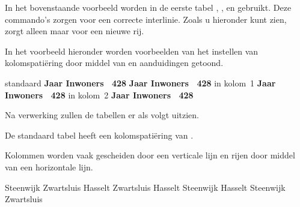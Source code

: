 In het bovenstaande voorbeeld worden in de eerste tabel
\type{\SR}, \type{\FR}, \type{\MR} en \type{\LR} gebruikt.
Deze commando's zorgen voor een correcte interlinie. Zoals u
hieronder kunt zien, zorgt \type{\NR} alleen maar voor een
nieuwe rij.

\haalbuffer

In het voorbeeld hieronder worden voorbeelden van het
instellen van kolomspati\"ering door middel van  en
 aanduidingen getoond.

\startbuffer
{}
{
  {standaard}
  {\starttabel[s0 | c | c |]
   \HL
   \VL \bf Jaar \VL \bf Inwoners \VL\SR
   \HL
    \VL  ~428 \VL\FR
     \VL\MR
     \VL\MR
     \VL\LR
   \HL
   \stoptabel}
  {}
  {\starttabel[| s0 c | c |]
   \HL
   \VL \bf Jaar \VL \bf Inwoners \VL\SR
   \HL
    \VL  ~428 \VL\FR
     \VL\MR
     \VL\MR
     \VL\LR
   \HL
   \stoptabel}
  { in kolom~1}
  {\starttabel[| c | s0 c |]
   \HL
   \VL \bf Jaar \VL \bf Inwoners \VL\SR
   \HL
    \VL  ~428 \VL\FR
     \VL\MR
     \VL\MR
     \VL\LR
   \HL
   \stoptabel}
  { in kolom~2}
  {\starttabel[s1 | c | c |]
   \HL
   \VL \bf Jaar \VL \bf Inwoners \VL\SR
   \HL
    \VL  ~428 \VL\FR
     \VL\MR
     \VL\MR
     \VL\LR
   \HL
   \stoptabel}
  {}
  {}
  {}
\stopcombinatie}
\stopbuffer

\typebuffer

Na verwerking zullen de tabellen er als volgt uitzien.

\haalbuffer

De standaard tabel heeft een kolomspati\"ering van .

Kolommen worden vaak gescheiden door een verticale lijn
en rijen door middel van een horizontale lijn.

\startbuffer
{}
\starttabel[|c|c|c|]
\NC Steenwijk  \NC Zwartsluis \NC Hasselt    \NC\SR
\DC            \DL            \DC               \DR
\NC Zwartsluis \VL Hasselt    \VL Steenwijk  \NC\SR
\DC            \DL            \DC               \DR
\NC Hasselt    \NC Steenwijk  \NC Zwartsluis \NC\SR
\stoptabel
\stopbuffer

